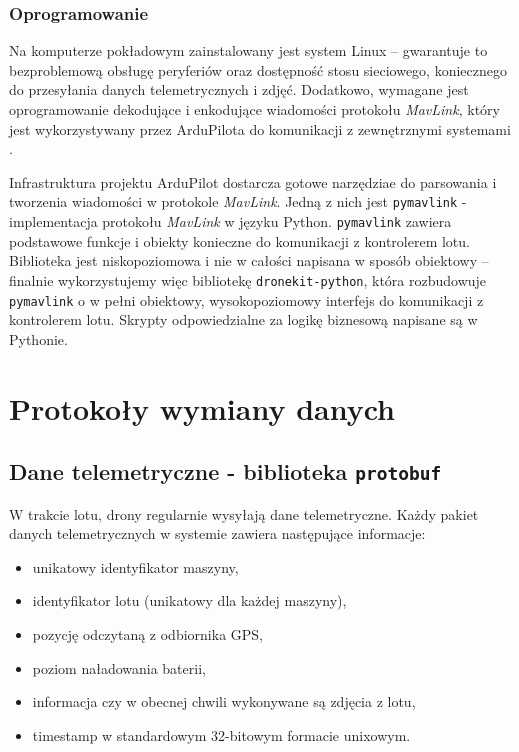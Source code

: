 \subsubsection{Oprogramowanie}

Na komputerze pokładowym zainstalowany jest system Linux -- gwarantuje to bezproblemową
obsługę peryferiów oraz dostępność stosu sieciowego, koniecznego do przesyłania 
danych telemetrycznych i zdjęć.
Dodatkowo, wymagane jest oprogramowanie dekodujące
i enkodujące wiadomości protokołu \textit{MavLink}, który jest wykorzystywany przez 
ArduPilota do komunikacji z zewnętrznymi systemami \cite{ardupilot_mavlink}.

Infrastruktura projektu ArduPilot dostarcza gotowe narzędziae do
parsowania i tworzenia wiadomości w protokole \textit{MavLink}.
Jedną z nich jest \texttt{pymavlink} - implementacja protokołu \textit{MavLink} 
w języku Python. \texttt{pymavlink} zawiera podstawowe funkcje i obiekty konieczne
do komunikacji z kontrolerem lotu. Biblioteka jest niskopoziomowa i nie w całości
napisana w sposób obiektowy -- finalnie wykorzystujemy więc bibliotekę
\texttt{dronekit-python}\cite{dronekit_python}, która rozbudowuje \texttt{pymavlink}
o w pełni obiektowy, wysokopoziomowy interfejs do komunikacji z kontrolerem lotu. 
Skrypty odpowiedzialne za logikę biznesową napisane są w Pythonie.

\section{Protokoły wymiany danych}

\subsection{Dane telemetryczne - biblioteka \texttt{protobuf}}


W trakcie lotu, drony regularnie wysyłają dane telemetryczne. Każdy pakiet
danych telemetrycznych w systemie zawiera następujące informacje:
\begin{itemize}
	\item unikatowy identyfikator maszyny,
	\item identyfikator lotu (unikatowy dla każdej maszyny),
	\item pozycję odczytaną z odbiornika GPS,
	\item poziom naładowania baterii,
	\item informacja czy w obecnej chwili wykonywane są zdjęcia z lotu,
	\item timestamp w standardowym 32-bitowym formacie unixowym.
\end{itemize}

